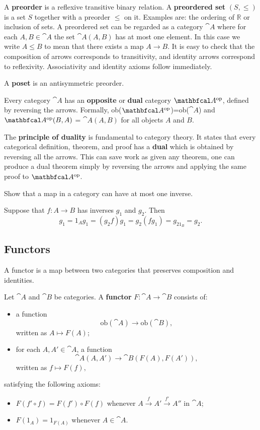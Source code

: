 A \textbf{preorder} is a reflexive transitive binary relation. A \textbf{preordered set} $(S,\leq)$ is a set $S$ together with a preorder $\leq$ on it. Examples are: the ordering of $\mathbb{R}$ or inclusion of sets.
A preordered set can be regarded as a category $\cat{A}$ where for each $A,B\in \cat{A}$ the set $\cat{A}(A,B)$ has at most one element. In this case we write $A\leq B$ to mean that there exists a map $A\to B$. It is easy to check that the composition of arrows corresponds to transitivity, and identity arrows correspond to reflexivity. Associativity and identity axioms follow immediately.

A \textbf{poset} is an antisymmetric preorder.\bigskip

Every category $\cat{A}$ has an \textbf{opposite}  or \textbf{dual} category $\catop{A}$, defined by reversing the arrows. Formally, ob($\catop{A}$)=ob($\cat{A}$) and $\catop{A}(B,A)$ = $\cat{A}(A,B)$ for all objects $A$ and $B$.

\begin{remark}
    The \textbf{principle of duality} is fundamental to category theory. It states that every categorical definition, theorem, and proof has a \textbf{dual} which is obtained by reversing all the arrows. This can save work as given any theorem, one can produce a dual theorem simply by reversing the arrows and applying the same proof to $\catop{A}$.
\end{remark}

\begin{exercise}
    Show that a map in a category can have at most one inverse.
\end{exercise}
\begin{solution}
    Suppose that $f: A\to B$ has inverses $g_1$ and $g_2$. Then
    $$g_1 = 1_Ag_1 = (g_2f)g_1 = g_2(fg_1) = g_21_B = g_2.$$
\end{solution}

\subsection{Functors}
A functor is a map between two categories that preserves composition and identities.
\begin{definition}
    Let $\cat{A}$ and $\cat{B}$ be categories. A \textbf{functor} $F: \cat{A}\to \cat{B}$ consists of:
    \begin{itemize}
        \item a function
            $$\text{ob}(\cat{A})\to \text{ob}(\cat{B}),$$
            written as $A\mapsto F(A)$;
        \item for each $A,A'\in \cat{A}$, a function
            $$\cat{A}(A,A')\to \cat{B}(F(A),F(A')),$$
            written as $f\mapsto F(f),$
    \end{itemize}
    satisfying the following axioms:
    \begin{itemize}
        \item $F(f'\circ f)=F(f')\circ F(f)$ whenever $A\xrightarrow{f}A'\xrightarrow{f'}A''$ in $\cat{A}$;
        \item $F(1_A) = 1_{F(A)}$ whenever $A\in \cat{A}$.
    \end{itemize}
\end{definition}

